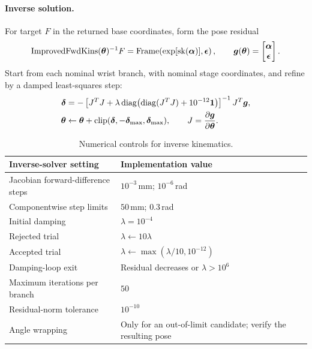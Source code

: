 \documentclass[../main.tex]{subfiles}
\begin{document}
\paragraph{Inverse solution.}
For target $F$ in the returned base coordinates, form the pose residual
\begin{equation*}
\operatorname{ImprovedFwdKins}(\bm{\theta})^{-1}F
=\operatorname{Frame}\!\left(\exp[\operatorname{sk}(\bm{\alpha})],\bm{\epsilon}\right),\qquad
\bm{g}(\bm{\theta})=\begin{bmatrix}\bm{\alpha}\\\bm{\epsilon}\end{bmatrix}.
\end{equation*}
Start from each nominal wrist branch, with nominal stage coordinates, and refine by a damped least-squares step:
\begin{equation}\label{eq:ik-iter}
\begin{aligned}
\bm{\delta}&=-\left[J^TJ+\lambda\operatorname{diag}\bigl(\operatorname{diag}(J^TJ)+10^{-12}\bm{1}\bigr)\right]^{-1}J^T\bm{g},\\
\bm{\theta}&\leftarrow\bm{\theta}+\operatorname{clip}(\bm{\delta},-\bm{\delta}_{\max},\bm{\delta}_{\max}),\qquad
J=\frac{\partial\bm{g}}{\partial\bm{\theta}}.
\end{aligned}
\end{equation}
\begin{table}[H]
\centering\small
\begin{tabular}{@{}ll@{}}
\toprule
Inverse-solver setting & Implementation value \\\midrule
Jacobian forward-difference steps & $10^{-3}$\,mm; $10^{-6}$\,rad \\
Componentwise step limits & $50$\,mm; $0.3$\,rad \\
Initial damping & $\lambda=10^{-4}$ \\
Rejected trial & $\lambda\leftarrow10\lambda$ \\
Accepted trial & $\lambda\leftarrow\max(\lambda/10,10^{-12})$ \\
Damping-loop exit & Residual decreases or $\lambda>10^6$ \\
Maximum iterations per branch & $50$ \\
Residual-norm tolerance & $10^{-10}$ \\
Angle wrapping & Only for an out-of-limit candidate; verify the resulting pose \\
\bottomrule
\end{tabular}
\caption{Numerical controls for inverse kinematics.}
\end{table}
\end{document}
